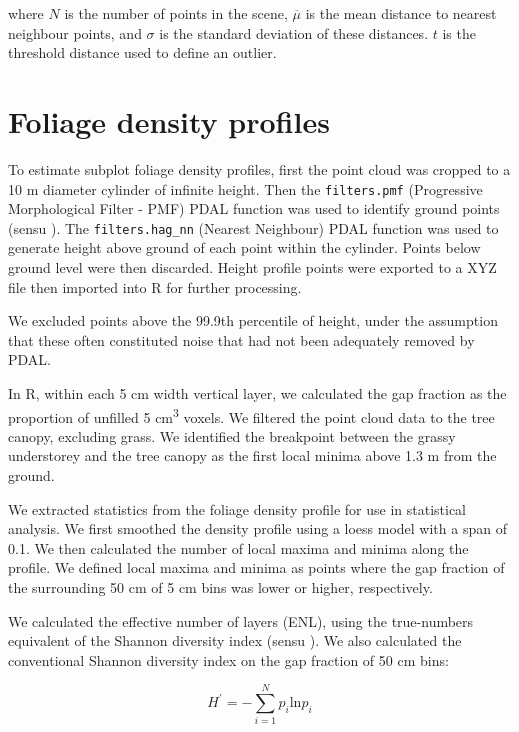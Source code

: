 \documentclass[11pt,a4paper]{article}
\begin{document}
where $N$ is the number of points in the scene, $\overline{\mu}$ is the mean distance to nearest neighbour points, and $\sigma$ is the standard deviation of these distances. $t$ is the threshold distance used to define an outlier.

\section{Foliage density profiles}

To estimate subplot foliage density profiles, first the point cloud was cropped to a 10 m diameter cylinder of infinite height. Then the \texttt{filters.pmf} (Progressive Morphological Filter - PMF) PDAL function was used to identify ground points (sensu \citealt{Zhang2003}). The \texttt{filters.hag\_nn} (Nearest Neighbour) PDAL function was used to generate height above ground of each point within the cylinder. Points below ground level were then discarded. Height profile points were exported to a XYZ file then imported into R for further processing. 

We excluded points above the 99.9th percentile of height, under the assumption that these often constituted noise that had not been adequately removed by PDAL.

In R, within each 5 cm width vertical layer, we calculated the gap fraction as the proportion of unfilled 5 cm\textsuperscript{3} voxels. We filtered the point cloud data to the tree canopy, excluding grass. We identified the breakpoint between the grassy understorey and the tree canopy as the first local minima above 1.3 m from the ground. 

We extracted statistics from the foliage density profile for use in statistical analysis. We first smoothed the density profile using a loess model with a span of 0.1. We then calculated the number of local maxima and minima along the profile. We defined local maxima and minima as points where the gap fraction of the surrounding 50 cm of 5 cm bins was lower or higher, respectively.

We calculated the effective number of layers (ENL), using the true-numbers equivalent of the Shannon diversity index (sensu \citep{Ehbrecht2016}). We also calculated the conventional Shannon diversity index on the gap fraction of 50 cm bins:

\begin{equation}
	H^{\prime{}} = - \sum_{i=1}^{N} p_{i} \text{ln} p_{i}
\end{equation}
\end{document}
